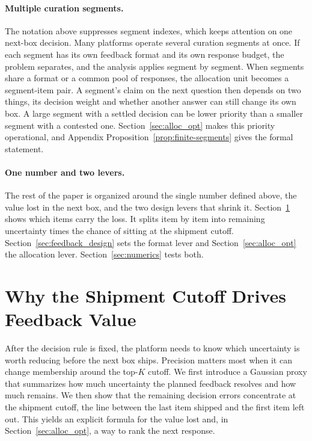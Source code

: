 \documentclass[11pt]{article}
\theoremstyle{definition}
\theoremstyle{remark}
\newcommand{\1}{\mathbf{1}}
\begin{document}
\paragraph{Multiple curation segments.}\label{subsec:finite-segments}
The notation above suppresses segment indexes, which keeps attention on
one next-box decision. Many platforms operate several curation segments
at once. If each segment has its own feedback format and its own
response budget, the problem separates, and the analysis applies
segment by segment. When segments share a format or a common pool of
responses, the allocation unit becomes a segment-item pair. A segment's
claim on the next question then depends on two things, its decision
weight and whether another answer can still change its own box. A
large segment with a settled decision can be lower priority than a
smaller segment with a contested one.
Section~\ref{sec:alloc_opt} makes this priority operational, and
Appendix Proposition~\ref{prop:finite-segments} gives the formal
statement.

\paragraph{One number and two levers.}
The rest of the paper is organized around the single number defined
above, the value lost in the next box, and the two design levers that
shrink it. Section~\ref{sec:gap-analysis} shows which items carry the loss. It
splits item by item into remaining uncertainty times the chance of
sitting at the shipment cutoff. Section~\ref{sec:feedback_design} sets
the format lever and Section~\ref{sec:alloc_opt} the allocation lever.
Section~\ref{sec:numerics} tests both.

\section{Why the Shipment Cutoff Drives Feedback Value}
\label{sec:gap-analysis}

After the decision rule is fixed, the platform needs to know which
uncertainty is worth reducing before the next box ships. Precision
matters most when it can change membership around the top-\(K\) cutoff.
We first introduce a Gaussian proxy that summarizes how much uncertainty
the planned feedback resolves and how much remains. We then show that
the remaining decision errors concentrate at the shipment cutoff, the
line between the last item shipped and the first item left out. This
yields an explicit formula for the value lost and, in
Section~\ref{sec:alloc_opt}, a way to rank the next response.
\end{document}
